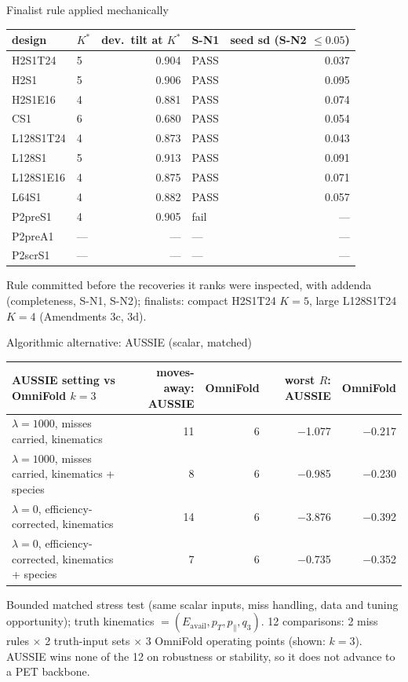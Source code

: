 \documentclass[aspectratio=169,10pt]{beamer}
\def\evidencetext{}
\begin{document}
\gdef\evidencetext{\texttt{dev/SCREENS-20260927-3d.json}; \texttt{dev/FINALIST\_RULE-20260926.md}}
\begin{frame}{Finalist rule applied mechanically}
{\scriptsize
\begin{tabular}{llrlr}
\toprule
design & $K^*$ & dev.\ tilt at $K^*$ & S-N1 & seed sd (S-N2 $\le 0.05$) \\
\midrule
H2S1T24 & 5 & 0.904 & PASS & 0.037 \\
H2S1 & 5 & 0.906 & PASS & 0.095 \\
H2S1E16 & 4 & 0.881 & PASS & 0.074 \\
CS1 & 6 & 0.680 & PASS & 0.054 \\
L128S1T24 & 4 & 0.873 & PASS & 0.043 \\
L128S1 & 5 & 0.913 & PASS & 0.091 \\
L128S1E16 & 4 & 0.875 & PASS & 0.071 \\
L64S1 & 4 & 0.882 & PASS & 0.057 \\
P2preS1 & 4 & 0.905 & fail & --- \\
P2preA1 & --- & --- & --- & --- \\
P2scrS1 & --- & --- & --- & --- \\
\bottomrule
\end{tabular}}\par\vspace{0.2cm}\small Rule committed before the recoveries it ranks were inspected, with addenda (completeness, S-N1, S-N2); finalists: compact H2S1T24 $K{=}5$, large L128S1T24 $K{=}4$ (Amendments 3c, 3d).
\end{frame}

\gdef\evidencetext{\texttt{scalar/results/SCALAR\_AUSSIE\_MATCHED-20260925.json}; \texttt{scalar/SCALAR\_AUSSIE\_MATCHED-20260925.md}}
\begin{frame}{Algorithmic alternative: AUSSIE (scalar, matched)}
{\scriptsize
\begin{tabular}{lrrrr}
\toprule
AUSSIE setting vs OmniFold $k{=}3$ & moves-away: AUSSIE & OmniFold & worst $R$: AUSSIE & OmniFold \\
\midrule
$\lambda{=}1000$, misses carried, kinematics & 11 & 6 & \ensuremath{-}1.077 & \ensuremath{-}0.217 \\
$\lambda{=}1000$, misses carried, kinematics + species & 8 & 6 & \ensuremath{-}0.985 & \ensuremath{-}0.230 \\
$\lambda{=}0$, efficiency-corrected, kinematics & 14 & 6 & \ensuremath{-}3.876 & \ensuremath{-}0.392 \\
$\lambda{=}0$, efficiency-corrected, kinematics + species & 7 & 6 & \ensuremath{-}0.735 & \ensuremath{-}0.352 \\
\bottomrule
\end{tabular}}\par\vspace{0.2cm}\small Bounded matched stress test (same scalar inputs, miss handling, data and tuning opportunity); truth kinematics $= (E_\mathrm{avail}, p_T, p_\parallel, q_3)$. 12 comparisons: 2 miss rules $\times$ 2 truth-input sets $\times$ 3 OmniFold operating points (shown: $k{=}3$). AUSSIE wins none of the 12 on robustness or stability, so it does not advance to a PET backbone.
\end{frame}
\end{document}
